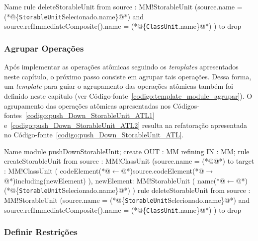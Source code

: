 \begin{codigo}[caption={[ATL representando a operação atômica \texttt{delete}.] ATL representando a operação atômica \texttt{delete}.},escapeinside={(*@}{@*)}, basicstyle=\footnotesize, label={codigo:push_Down_StorableUnit_ATL2}, language=ATL]{Name}
rule deleteStorableUnit {
	from
		source : MM!StorableUnit (source.name = (*@\{\texttt{StorableUnit}Selecionado.name\}@*) and source.refImmediateComposite().name = (*@\{\texttt{ClassUnit}.name\}@*) )
	to
		drop
}
\end{codigo}

\subsubsection{Agrupar Operações}

Após implementar as operações atômicas seguindo os \textit{templates} apresentados neste capítulo, o próximo passo consiste em agrupar tais operações. Dessa forma, um \textit{template} para guiar o agrupamento das operações atômicas também foi definido neste capítulo (ver Código-fonte~\ref{codigo:template_module_agrupar}). O agrupamento das operações atômicas apresentadas nos Códigos-fontes~\ref{codigo:push_Down_StorableUnit_ATL1} e~\ref{codigo:push_Down_StorableUnit_ATL2} resulta na refatoração apresentada no Código-fonte~\ref{codigo:push_Down_StorableUnit_ATL}.

\begin{codigo}[caption={[ATL representando a refatoração \textit{Push Down Attribute}.] ATL da refatoração \textit{Push Down Attribute}.},escapeinside={(*@}{@*)}, basicstyle=\footnotesize, label={codigo:push_Down_StorableUnit_ATL}, language=ATL]{Name}
module pushDownStorableUnit;
create OUT : MM refining IN : MM;
rule createStorableUnit {
	from
		source : MM!ClassUnit (source.name = (*@@*)
	to 
		target : MM!ClassUnit (
			codeElement(*@$\leftarrow$@*)source.codeElement(*@$\rightarrow$@*)including(newElement)
		),
		newElement: MM!StorableUnit (
			name(*@$\leftarrow$@*)(*@\{\texttt{StorableUnit}Selecionado.name\}@*)
		)
}
rule deleteStorableUnit {
	from
		source : MM!StorableUnit (source.name = (*@\{\texttt{StorableUnit}Selecionado.name\}@*) and source.refImmediateComposite().name = (*@\{\texttt{ClassUnit}.name\}@*) )
	to
		drop
}
\end{codigo}

\subsubsection{Definir Restrições}

